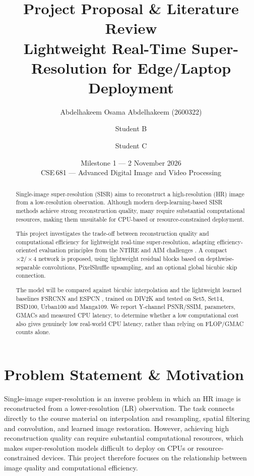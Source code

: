 \documentclass[11pt,a4paper]{article}
\title{\LARGE Project Proposal \& Literature Review \\[4pt]
\large Lightweight Real-Time Super-Resolution for Edge/Laptop Deployment}
\author{
  Abdelhakeem Osama Abdelhakeem (2600322) \and
  Student B  \and
  Student C 
}
\date{Milestone 1 --- 2 November 2026 \\{} CSE\,681 --- Advanced Digital Image and Video Processing}
\begin{document}
\maketitle

\begin{abstract}
Single-image super-resolution (SISR) aims to reconstruct a high-resolution
(HR) image from a low-resolution observation. Although modern
deep-learning-based SISR methods achieve strong reconstruction quality,
many require substantial computational resources, making them unsuitable
for CPU-based or resource-constrained deployment.

This project investigates the trade-off between reconstruction quality and
computational efficiency for lightweight real-time super-resolution,
adapting efficiency-oriented evaluation principles from the NTIRE and AIM
challenges \citep{ren2025ntire,aim2025}. A compact $\times2/\times4$
network is proposed, using lightweight residual blocks based on
depthwise-separable convolutions, PixelShuffle upsampling, and an optional
global bicubic skip connection.

The model will be compared against bicubic interpolation and the
lightweight learned baselines FSRCNN and ESPCN
\citep{dong2016fsrcnn,shi2016espcn}, trained on DIV2K
\citep{agustsson2017div2k} and tested on Set5, Set14, BSD100, Urban100 and
Manga109. We report Y-channel PSNR/SSIM, parameters, GMACs and measured
CPU latency, to determine whether a low computational cost also gives
genuinely low real-world CPU latency, rather than relying on FLOP/GMAC
counts alone.
\end{abstract}

\section{Problem Statement \& Motivation}
\label{sec:motivation}

Single-image super-resolution is an inverse problem in which an HR image is
reconstructed from a lower-resolution (LR) observation. The task connects
directly to the course material on interpolation and resampling, spatial
filtering and convolution, and learned image restoration. However, achieving
high reconstruction quality can require substantial computational resources,
which makes super-resolution models difficult to deploy on CPUs or
resource-constrained devices. This project therefore focuses on the
relationship between image quality and computational efficiency.
\end{document}
